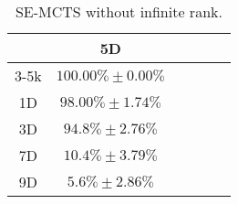 

\begin{table}[h]
    \centering
    \caption{SE-MCTS without infinite rank.}
    \begin{tabular}{cccccc}
        \toprule
        & 5D  \\
        \midrule
        3-5k & $100.00\%\pm0.00\%$ \\
        1D & $98.00\%\pm1.74\%$ \\
        3D & $94.8\%\pm2.76\%$ \\
        7D & $10.4\%\pm3.79\%$ \\
        9D & $5.6\%\pm2.86\%$ \\
        
        \bottomrule
    \end{tabular}
    \label{tab:bt-without-infite-rank}
\end{table}
